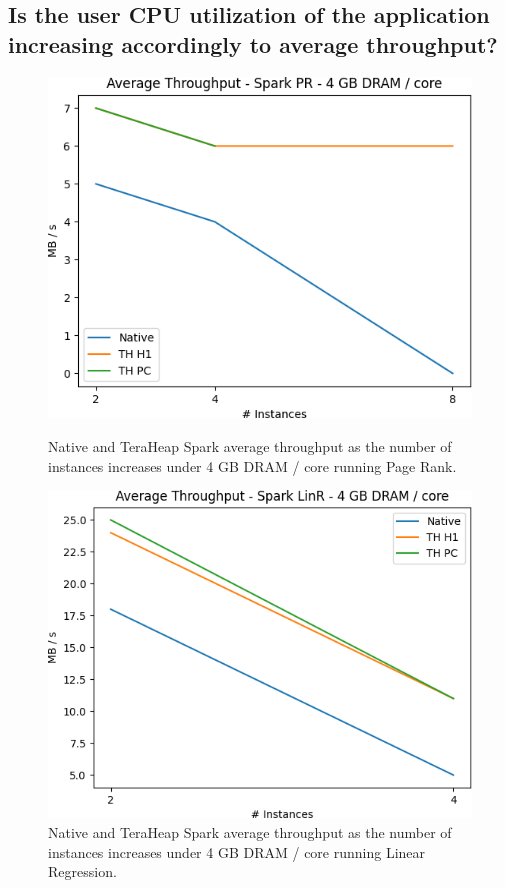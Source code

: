 \begin{table}[thbp]
\begin{tabular}{|c|c|c|c|c|}
    \hline
  \end{tabular}
\end{table}

\subsection{Is the user CPU utilization of the application increasing
accordingly to average throughput?}
\begin{figure}[thbp]
	\centering
        \includegraphics[width=\linewidth]{./fig/PR_64_THR.png}
    \caption{Native and TeraHeap Spark average throughput
	as the number of instances increases under 4 GB DRAM / core running Page Rank.}
\label{fig:pr_64_thr}
        \includegraphics[width=\linewidth]{./fig/LINR_64_THR.png}
    \caption{Native and TeraHeap Spark average throughput
        as the number of instances increases under 4 GB DRAM / core running Linear Regression.}
                \label{fig:linr_64_thr}
\end{figure}

